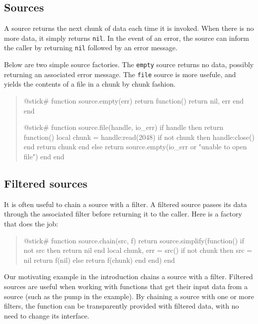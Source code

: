 \documentclass[10pt]{article}
\begin{document}
\subsection{Sources}

A source returns the next chunk of data each time it is
invoked. When there is no more data, it simply returns
\texttt{nil}.  In the event of an error, the source can inform the
caller by returning \texttt{nil} followed by an error message.

Below are two simple source factories. The \texttt{empty} source
returns no data, possibly returning an associated error
message. The \texttt{file} source is more usefule, and 
yields the contents of a file in a chunk by chunk fashion.
\begin{quote}
\begin{lua}
@stick#
function source.empty(err)
  return function()
    return nil, err
  end
end
%

@stick#
function source.file(handle, io_err)
  if handle then 
    return function()
      local chunk = handle:read(2048)
      if not chunk then handle:close() end
      return chunk
    end
  else return source.empty(io_err or "unable to open file") end
end
%
\end{lua}
\end{quote}

\subsection{Filtered sources}

It is often useful to chain a source with a filter. A 
filtered source passes its data through the
associated filter before returning it to the caller. 
Here is a factory that does the job:
\begin{quote}
\begin{lua}
@stick#
function source.chain(src, f)
  return source.simplify(function()
    if not src then return nil end
    local chunk, err = src()
    if not chunk then 
      src = nil
      return f(nil)
    else return f(chunk) end
  end)
end
%
\end{lua}
\end{quote}

Our motivating example in the introduction chains a source
with a filter. Filtered sources are useful when working with
functions that get their input data from a source (such as
the pump in the example). By chaining a source with one or
more filters, the function can be transparently provided
with filtered data, with no need to change its interface. 
\end{document}
